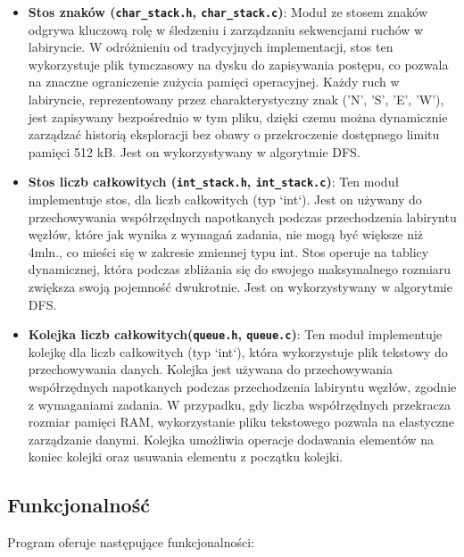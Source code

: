 \documentclass{article}
\begin{document}
\begin{itemize}
    
    \item \textbf{Stos znaków (\texttt{char\_stack.h}, \texttt{char\_stack.c})}: Moduł ze stosem znaków odgrywa kluczową rolę w śledzeniu i zarządzaniu sekwencjami ruchów w labiryncie. W odróżnieniu od tradycyjnych implementacji, stos ten wykorzystuje plik tymczasowy na dysku do zapisywania postępu, co pozwala na znaczne ograniczenie zużycia pamięci operacyjnej. Każdy ruch w labiryncie, reprezentowany przez charakterystyczny znak ('N', 'S', 'E', 'W'), jest zapisywany bezpośrednio w tym pliku, dzięki czemu można dynamicznie zarządzać historią eksploracji bez obawy o przekroczenie dostępnego limitu pamięci 512 kB. Jest on wykorzystywany w algorytmie DFS.


    \item \textbf{Stos liczb całkowitych (\texttt{int\_stack.h}, \texttt{int\_stack.c})}:
    Ten moduł implementuje stos, dla liczb całkowitych (typ `int`). Jest on używany do przechowywania współrzędnych napotkanych podczas przechodzenia labiryntu węzłów, które jak wynika z wymagań zadania, nie mogą być większe niż 4mln., co mieści się w zakresie zmiennej typu int. Stos operuje na tablicy dynamicznej, która podczas zbliżania się do swojego maksymalnego rozmiaru zwiększa swoją pojemność dwukrotnie. Jest on wykorzystywany w algorytmie DFS.


    \item \textbf{Kolejka liczb całkowitych(\texttt{queue.h}, \texttt{queue.c})}:
    Ten moduł implementuje kolejkę dla liczb całkowitych (typ `int`), która wykorzystuje plik tekstowy do przechowywania danych. Kolejka jest używana do przechowywania współrzędnych napotkanych podczas przechodzenia labiryntu węzłów, zgodnie z wymaganiami zadania. W przypadku, gdy liczba współrzędnych przekracza rozmiar pamięci RAM, wykorzystanie pliku tekstowego pozwala na elastyczne zarządzanie danymi. Kolejka umożliwia operacje dodawania elementów na koniec kolejki oraz usuwania elementu z początku kolejki.
    
    
\end{itemize}

    

\subsection{Funkcjonalność}

Program oferuje następujące funkcjonalności:
\end{document}
